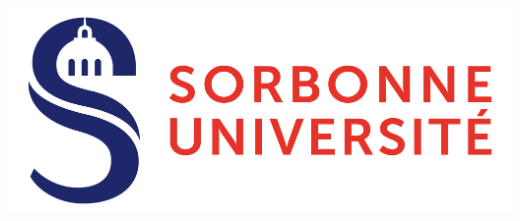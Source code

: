 \documentclass[a4paper,usenames,dvipsnames]{report}
\begin{document}
\thispagestyle{empty}


\includegraphics[scale=.08]{./figures/Logo_Sorbonne_Universite.png}

\vspace*{1.5cm}
\end{document}
